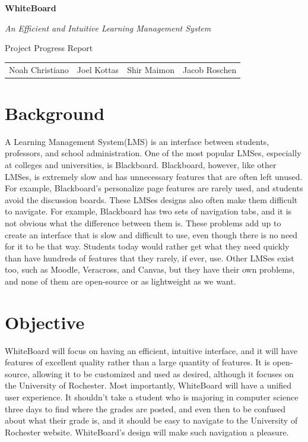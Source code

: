 \documentclass{article}
\begin{document}
\begin{center}

    \huge{\textbf{WhiteBoard}}

    \huge{\textit{An Efficient and Intuitive Learning Management System}}

    \huge{Project Progress Report}

    \vspace{10 pt}

    \large{
        \begin{tabular}{cccc}
            Noah Christiano&Joel Kottas&Shir Maimon&Jacob Roschen\\
        \end{tabular}
    }

\end{center}

\vspace{10 pt}

\section{Background}

A Learning Management System(LMS) is an interface between students, professors,
and school administration. One of the most popular LMSes, especially at
colleges and universities, is Blackboard\cite{Blackboard}.  Blackboard,
however, like other LMSes, is extremely slow and has unnecessary features that
are often left unused. For example, Blackboard's personalize page features are
rarely used, and students avoid the discussion boards. These LMSes designs
also often make them difficult to navigate. For example, Blackboard has two
sets of navigation tabs, and it is not obvious what the difference between them
is. These problems add up to create an interface that is slow and difficult to
use, even though there is no need for it to be that way. Students today would
rather get what they need quickly than have hundreds of features that they
rarely, if ever, use. Other LMSes exist too, such as Moodle\cite{Moodle},
Veracross\cite{Veracross}, and Canvas\cite{Canvas}, but they have their own
problems, and none of them are open-source or as lightweight as we want.

\section{Objective}

WhiteBoard will focus on having an efficient, intuitive interface, and it will
have features of excellent quality rather than a large quantity of features. It
is open-source, allowing it to be customized and used as desired, although it
focuses on the University of Rochester. Most importantly, WhiteBoard will have
a unified user experience. It shouldn't take a student who is majoring in
computer science three days to find where the grades are posted, and even then
to be confused about what their grade is, and it should be easy to navigate to
the University of Rochester website. WhiteBoard's design will make such
navigation a pleasure.
\end{document}
